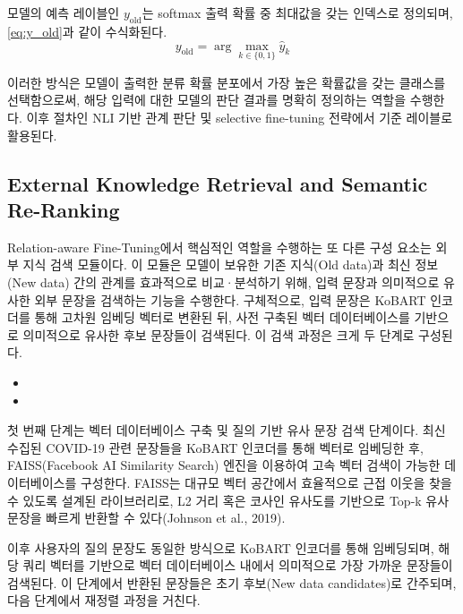 \documentclass[a4paper,fleqn]{cas-sc}
\begin{document}
모델의 예측 레이블인 \(y_{\text{old}}\)는 softmax 출력 확률 중 최대값을 갖는 인덱스로 정의되며, \cref{eq:y_old}과 같이 수식화된다.
\begin{equation}
    y_{\text{old}} = \arg\max_{k \in \{0, 1\}} \hat{y}_k
    \label{eq:y_old}
\end{equation}

이러한 방식은 모델이 출력한 분류 확률 분포에서 가장 높은 확률값을 갖는 클래스를 선택함으로써, 해당 입력에 대한 모델의 판단 결과를 명확히 정의하는 역할을 수행한다. 이후 절차인 NLI 기반 관계 판단 및 selective fine-tuning 전략에서 기준 레이블로 활용된다.


\subsection{External Knowledge Retrieval and Semantic Re-Ranking}

Relation-aware Fine-Tuning에서 핵심적인 역할을 수행하는 또 다른 구성 요소는 외부 지식 검색 모듈이다. 이 모듈은 모델이 보유한 기존 지식(Old data)과 최신 정보(New data) 간의 관계를 효과적으로 비교·분석하기 위해, 입력 문장과 의미적으로 유사한 외부 문장을 검색하는 기능을 수행한다.
구체적으로, 입력 문장은 KoBART 인코더를 통해 고차원 임베딩 벡터로 변환된 뒤, 사전 구축된 벡터 데이터베이스를 기반으로 의미적으로 유사한 후보 문장들이 검색된다. 이 검색 과정은 크게 두 단계로 구성된다.

\begin{itemize}
    \item{}
    
    \item{}
\end{itemize} 

첫 번째 단계는 벡터 데이터베이스 구축 및 질의 기반 유사 문장 검색 단계이다. 최신 수집된 COVID-19 관련 문장들을 KoBART 인코더를 통해 벡터로 임베딩한 후, FAISS(Facebook AI Similarity Search) 엔진을 이용하여 고속 벡터 검색이 가능한 데이터베이스를 구성한다. FAISS는 대규모 벡터 공간에서 효율적으로 근접 이웃을 찾을 수 있도록 설계된 라이브러리로, L2 거리 혹은 코사인 유사도를 기반으로 Top-k 유사 문장을 빠르게 반환할 수 있다(Johnson et al., 2019).

이후 사용자의 질의 문장도 동일한 방식으로 KoBART 인코더를 통해 임베딩되며, 해당 쿼리 벡터를 기반으로 벡터 데이터베이스 내에서 의미적으로 가장 가까운 문장들이 검색된다. 이 단계에서 반환된 문장들은 초기 후보(New data candidates)로 간주되며, 다음 단계에서 재정렬 과정을 거친다.
\end{document}

